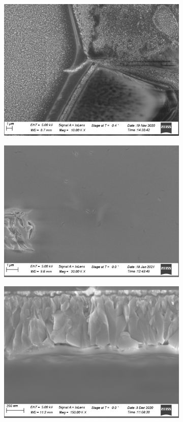 \begin{figure}[bht]
    \centering
    \begin{subfigure}{.45\textwidth}
        \centering
        \includegraphics[width=.79\textwidth]{Pics/sem/071_fto_old_1x1F.png}
		\caption{}%
		\label{fig:sem-old}
    \end{subfigure}
    \begin{subfigure}{.45\textwidth}
        \centering
        \includegraphics[width=.79\textwidth]{Pics/sem/147_steel_ph_10x.png}
		\caption{}%
		\label{fig:sem-ph}
    \end{subfigure}
    \begin{subfigure}{.45\textwidth}
        \centering
        \includegraphics[width=.8\textwidth]{Pics/sem/115_fto_cs_1x.png}

\end{subfigure}
\end{figure}
